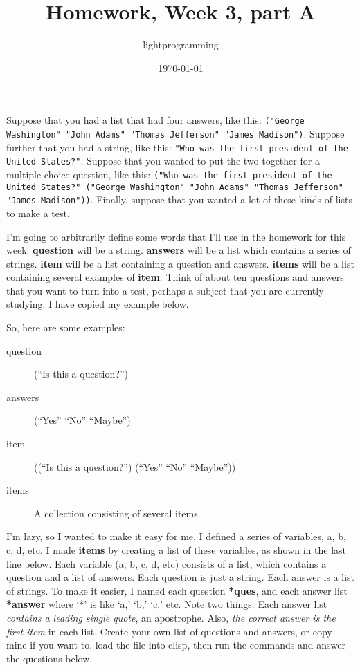 \documentclass{article}
\title{Homework, Week 3, part A}
\author{lightprogramming}
\date{\today}
\begin{document}
\maketitle{}

Suppose that you had a list that had four answers, like this: \texttt{("George Washington" "John Adams" "Thomas Jefferson" "James Madison")}. Suppose further that you had a string, like this: \texttt{"Who was the first president of the United States?"}. Suppose that you wanted to put the two together for a multiple choice question, like this: \texttt{("Who was the first president of the United States?"  ("George Washington" "John Adams" "Thomas Jefferson" "James Madison"))}. Finally, suppose that you wanted a lot of these kinds of lists to make a test.

I'm going to arbitrarily define some words that I'll use in the homework for this week. \textbf{question} will be a string. \textbf{answers} will be a list which contains a series of strings. \textbf{item} will be a list containing a question and answers. \textbf{items} will be a list containing several examples of \textbf{item}. Think of about ten questions and answers that you want to turn into a test, perhaps a subject that you are currently studying. I have copied my example below.

So, here are some examples:
\begin{description}
    \item[question] (``Is this a question?'')
    \item[answers] (``Yes'' ``No'' ``Maybe'')
    \item[item] ((``Is this a question?'') (``Yes'' ``No'' ``Maybe''))
    \item[items] A collection consisting of several items
\end{description}


I'm lazy, so I wanted to make it easy for me. I defined a series of variables, a, b, c, d, etc. I made \textbf{items} by creating a list of these variables, as shown in the last line below. Each variable (a, b, c, d, etc) consists of a list, which contains a question and a list of answers. Each question is just a string. Each answer is a list of strings. To make it easier, I named each question \textbf{*ques}, and each answer list \textbf{*answer} where `*' is like `a,' `b,' `c,' etc.  Note two things. Each answer list \textit{contains a leading single quote}, an apostrophe. Also, \textit{the correct answer is the first item} in each list. Create your own list of questions and answers, or copy mine if you want to, load the file into clisp, then run the commands and answer the questions below.
\end{document}
